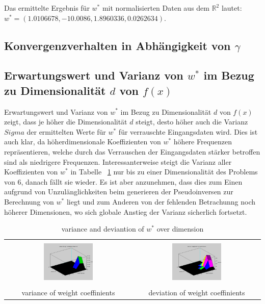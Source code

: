 \documentclass[]{report}
\begin{document}
Das ermittelte Ergebnis f\"ur $w^*$ mit normalisierten Daten aus dem $\mathbb{R}^2$ lautet: $w^*=(1.0106678, - 10.0086, 1.8960336, 0.0262634)$.

\subsection{Konvergenzverhalten in Abh\"angigkeit von $\gamma$}

\subsection{Erwartungswert und Varianz von $w^*$ im Bezug zu Dimensionalität $d$ von $f(x)$}

Erwartungswert und Varianz von $w^*$ im Bezug zu Dimensionalität $d$ von $f(x)$ zeigt, dass je h\"oher die Dimensionalität $d$ steigt, desto h\"oher auch die Varianz $Sigma$ der ermittelten Werte f\"ur $w^*$ f\"ur verrauschte Eingangsdaten wird. Dies ist auch klar, da höherdimensionale Koeffizienten von $w^*$ h\"ohere Frequenzen repr\"asentieren, welche durch das Verrauschen der Eingangsdaten st\"arker betroffen sind als niedrigere Frequenzen.
Interessanterweise steigt die Varianz aller Koeffizienten von $w^*$ in Tabelle ~\ref{tab:VarianceAndDeviantion} nur bis zu einer Dimensionalit\"at des Problems von 6, danach f\"allt sie wieder. Es ist aber anzunehmen, dass dies zum Einen aufgrund von Unzul\"anglichkeiten beim generieren der Pseudoinversen zur Berechnung von $w^*$ liegt und zum Anderen von der fehlenden Betrachunng noch h\"oherer Dimensionen, wo sich globale Anstieg der Varianz sicherlich fortsetzt.

\begin{table}[h]
\begin{tabular}{| c | c |}
\hline
 & \\
\includegraphics[width=0.4\textwidth]{./images/VarianceWeightCoeffinientsOverDimension.png} & \includegraphics[width=0.4\textwidth]{./images/DeviationWeightCoeffinientsOverDimension.png} \\
 & \\
variance of weight coeffinients & deviation of weight coeffinients \\
\hline
\end{tabular}
\caption{variance and deviantion of $w^*$ over dimension}
\label{tab:VarianceAndDeviantion}
\end{table}
\end{document}
